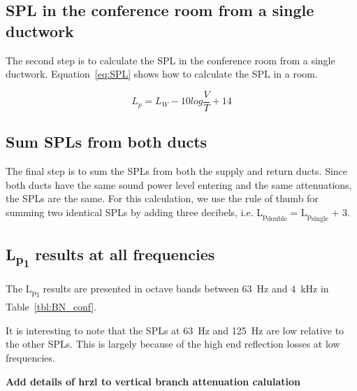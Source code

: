 \subsection{SPL in the conference room from a single ductwork}

The second step is to calculate the SPL in the conference room from a single ductwork.
Equation~\ref{eq:SPL} shows how to calculate the SPL in a room.

	\begin{equation}\label{eq:SPL}
		L_{p} = L_{W} - 10 log \frac{V}{T} + 14
	\end{equation}


\subsection{Sum SPLs from both ducts}

The final step is to sum the SPLs from both the supply and return ducts.
Since both ducts have the same sound power level entering and the same attenuations, the SPLs are the same.
For this calculation, we use the rule of thumb for summing two identical SPLs by adding three decibels, i.e. L\textsubscript{p\textsubscript{double}} = L\textsubscript{p\textsubscript{single}} + 3.


\subsection{L\textsubscript{p\textsubscript{1}} results at all frequencies}

The L\textsubscript{p\textsubscript{1}} results are presented in octave bands between 63~Hz and 4~kHz in Table~\ref{tbl:BN_conf}.

It is interesting to note that the SPLs at 63~Hz and 125~Hz are low relative to the other SPLs.
This is largely because of the high end reflection losses at low frequencies.

\textbf{Add details of hrzl to vertical branch attenuation calulation}



